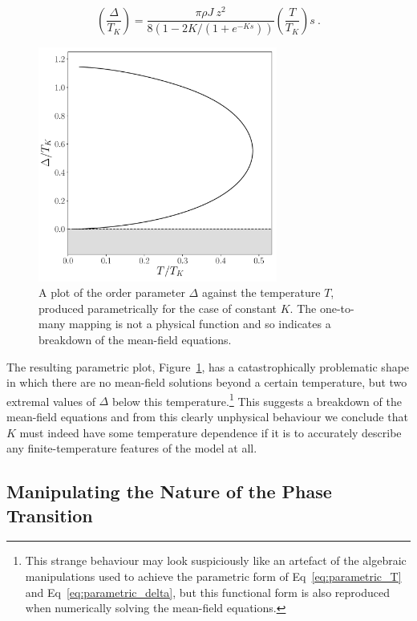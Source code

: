 \documentclass[12pt]{article}
\begin{document}
\begin{equation}
\left( \frac{\Delta}{T_K} \right) = \frac{\pi \rho J ~ z^2}{8 (1 - 2 K / (1 + e^{- K s}))} \left( \frac{T}{T_K} \right) s ~ .
\label{eq:parametric_delta}
\end{equation}

\begin{figure}[ht]
\centering
\includegraphics[width=0.7\textwidth]{Figures/new_delta_vs_T_parametric.pdf}
\caption{A plot of the order parameter $ \Delta $ against the temperature $ T $, produced parametrically for the case of constant $ K $. The one-to-many mapping is not a physical function and so indicates a breakdown of the mean-field equations.}
\label{fig:parametric}
\end{figure}

The resulting parametric plot, Figure~\ref{fig:parametric}, has a catastrophically problematic shape in which there are no mean-field solutions beyond a certain temperature, but two extremal values of $ \Delta $ below this temperature.\footnote{This strange behaviour may look suspiciously like an artefact of the algebraic manipulations used to achieve the parametric form of Eq~\eqref{eq:parametric_T} and Eq~\eqref{eq:parametric_delta}, but this functional form is also reproduced when numerically solving the mean-field equations.} This suggests a breakdown of the mean-field equations and from this clearly unphysical behaviour we conclude that $ K $ must indeed have some temperature dependence if it is to accurately describe any finite-temperature features of the model at all.

\subsection{Manipulating the Nature of the Phase Transition}
\label{subsec:manipulating_PT}
\end{document}
